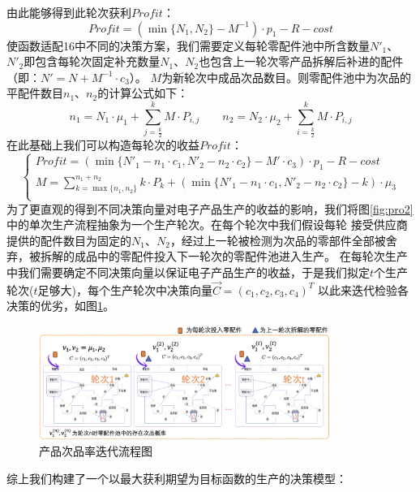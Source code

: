 \documentclass[withoutpreface,bwprint]{cumcmthesis} %
\begin{document}
由此能够得到此轮次获利$Profit$：
\begin{equation}
	\textit{Profit}=(\min \{N_{1},N_{2}\}-M^{-1})\cdot p_{1}-R-cost
	\label{eq:4}
\end{equation}
使函数适配16中不同的决策方案，我们需要定义每轮零配件池中所含数量$N'_{1}$、$N'_{2}$即包含每轮次固定补充数量$N_{1}$、$N_{2}$也包含上一轮次零产品拆解后补进的配件（即：$N'=N+M^{-1}\cdot c_{3}$）。
$M$为新轮次中成品次品数目。则零配件池中为次品的平配件数目$n_{1}$、$n_{2}$的计算公式如下：
\begin{equation}
	n_{1}=N_{1}\cdot \mu_{1}+\sum_{j=\frac{k}{2}}^{k}M\cdot P_{i,j} \qquad
	n_{2}=N_{2}\cdot \mu_{2}+\sum_{i=\frac{k}{2}}^{k}M\cdot P_{i,j}
\end{equation}
在此基础上我们可以构造每轮次的收益$Profit$：
\begin{equation}
	\left\{\begin{matrix}
		\textit{Profit}=(\min \{N'_{1}-n_{1}\cdot c_{1},N'_{2}-n_{2}\cdot c_{2}\}-M'\cdot c_{3})\cdot p_{1}-R-cost \\
		M=\sum_{k=\max \{n_{1},n_{2}\}}^{n_{1}+n_{2}}k\cdot P_{k} + (\min \{N'_{1}-n_{1}\cdot c_{1},N'_{2}-n_{2}\cdot c_{2}\}-k)\cdot \mu_{3}\\
	\end{matrix}\right.
	\label{eq:5}
\end{equation}
为了更直观的得到不同决策向量对电子产品生产的收益的影响，我们将图\ref{fig:pro2}中的单次生产流程抽象为一个生产轮次。在每个轮次中我们假设每轮
接受供应商提供的配件数目为固定的$N_{1}$、$N_{2}$，经过上一轮被检测为次品的零部件全部被舍弃，被拆解的成品中的零配件投入下一轮次的零配件池进入生产。
在每轮次生产中我们需要确定不同决策向量以保证电子产品生产的收益，于是我们拟定$t$个生产轮次($t$足够大)，每个生产轮次中决策向量$\vec{C}=(c_{1},c_{2},c_{3},c_{4})^{T}$
以此来迭代检验各决策的优劣，如图\ref{fig:pro2-2}。
\begin{figure}[H]
	\centering
	\includegraphics[width=0.85\textwidth]{Fig/pro2-2.png}
	\caption{产品次品率迭代流程图}
	\label{fig:pro2-2}
\end{figure}
综上我们构建了一个以最大获利期望为目标函数的生产的决策模型：
\end{document}
